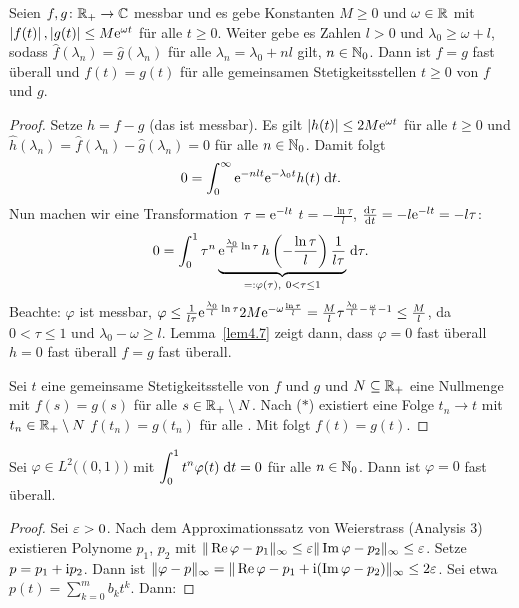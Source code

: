 \documentclass[a4paper,twoside,DIV15,BCOR12mm]{scrbook}
\begin{document}
\begin{thm}\label{thm4.6}
  Seien $f,g\colon\mathbb{R}_+\to\mathbb{C}$ messbar und es gebe Konstanten $M\ge0$ und $\omega\in\mathbb{R}$ mit $\left\lvert f(t)\right\lvert,\left\lvert g(t)\right\lvert\le M\mathrm{e}^{\omega
    t}$ für alle $t\ge0$. Weiter gebe es Zahlen $l>0$ und $\lambda_0\ge\omega+l$, sodass $\hat{f}(\lambda_n)=\hat{g}(\lambda_n)$
  für alle $\lambda_n=\lambda_0+nl$ gilt, $n\in\mathbb{N}_0$. Dann ist $f=g$ fast überall und $f(t)=g(t)$ für alle gemeinsamen
  Stetigkeitsstellen $t\ge0$ von $f$ und $g$.
\end{thm}
\begin{proof}
  Setze $h=f-g$ (das ist messbar). Es gilt $\left\lvert h(t)\right\lvert\le2M\mathrm{e}^{\omega t}$ für alle $t\ge0$ und $\hat{h}(\lambda_n) =
  \hat{f}(\lambda_n) - \hat{g}(\lambda_n) = 0$ für alle $n\in\mathbb{N}_0$. Damit folgt
  \[ 0 = \int_{0}^{\infty}{\mathrm{e}^{-nlt}\mathrm{e}^{-\lambda_0t}h(t)}\;\mathrm{d} t. \]
  Nun machen wir eine Transformation $\tau=\mathrm{e}^{-lt}$ \gdw $t=-\frac{\ln{\tau}}{l}$, $\frac{\mathrm{d}\tau}{\mathrm{d} t} = -l\mathrm{e}^{-lt} = -l\tau$:
  \[ 0 = \int_{0}^{1}{\tau^n\underbrace{\mathrm{e}^{\frac{\lambda_0}{l}\ln{\tau}}\,h\left(-\frac{\ln{\tau}}{l}\right) \frac{1}{l\tau}}
    _{=: \varphi(\tau),\ 0<\tau\le1}}\;\mathrm{d}\tau. \]
  Beachte: $\varphi$ ist messbar, $\varphi\leq\frac{1}{l\tau}\mathrm{e}^{\frac{\lambda_0}{l}\ln{\tau}}2M\mathrm{e}^{-\omega\frac{\ln{\tau}}{l}}
  = \frac{M}{l}\tau^{\frac{\lambda_0}{l}-\frac{\omega}{l}-1}\le \frac{M}{l}$, da $0<\tau\leq1$ und $\lambda_0-\omega\ge
  l$. Lemma~\ref{lem4.7} zeigt dann, dass $\varphi=0$ fast überall \folgt $h=0$ fast überall \folgt $f=g$ fast überall.

  Sei $t$ eine gemeinsame Stetigkeitsstelle von $f$ und $g$ und $N\subseteq\mathbb{R}_+$ eine Nullmenge mit $f(s)=g(s)$ für alle
  $s\in\mathbb{R}_+\setminus N$. Nach ($*$) existiert eine Folge $t_n\to t$ mit $t_n\in\mathbb{R}_+\setminus N$ \folgt $f(t_n)=g(t_n)$ für alle
  . Mit \ninf folgt $f(t)=g(t)$.
\end{proof}

\begin{lem}\label{lem4.7}
  Sei $\varphi\in L^2\bigl((0,1)\bigr)$ mit $\displaystyle\int_{0}^{1}{t^n\varphi(t)}\;\mathrm{d} t=0$ für alle $n\in\mathbb{N}_0$. Dann ist
  $\varphi=0$ fast überall.
\end{lem}
\begin{proof}
  Sei $\varepsilon>0$. Nach dem Approximationssatz von Weierstrass (Analysis 3) existieren Polynome $p_1$, $p_2$ mit $\|
  \operatorname{Re}{\varphi}-p_1 \|_\infty \le \varepsilon \| \operatorname{Im}{\varphi}-p_2 \|_\infty \le \varepsilon$. Setze $p=p_1+\mathrm{i} p_2$. Dann ist $\| \varphi-p
  \|_\infty = \| \operatorname{Re}{\varphi} - p_1 + \mathrm{i}(\operatorname{Im}{\varphi}-p_2) \|_\infty \leq 2\varepsilon$. Sei etwa $p(t)=\sum_{k=0}^m{b_kt^k}$. Dann:
\end{proof}
\end{document}
